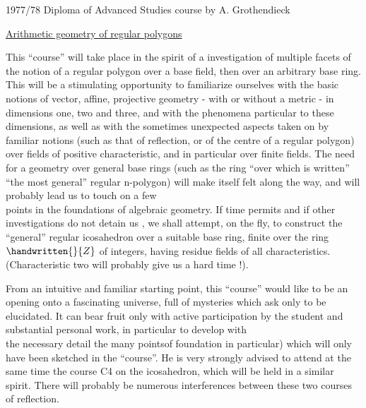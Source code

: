 \begin{center}
1977/78 Diploma of Advanced Studies course by A. Grothendieck

\uline{Arithmetic geometry of regular polygons}
\end{center}

{\reversemarginpar\margin{\handwritten{!}}\normalmarginpar}%
This ``course'' will take place in the spirit of a  investigation of multiple facets of the notion of a regular polygon over a base field, then over an arbitrary base ring. This will be a stimulating opportunity to familiarize ourselves with the basic notions of vector, affine, projective geometry - with or without a metric - in dimensions one, two and three, and with the phenomena particular to these dimensions, as well as with the sometimes unexpected aspects taken on by familiar notions (such as that of reflection, or of the centre of a regular polygon) over fields of positive characteristic, and in particular over finite fields. The need for a geometry over general base rings (such as the ring ``over which is written'' ``the most general'' regular $\mathrm{n}$-polygon) will make itself felt along the way, and will probably lead us to touch on a few\\
points in the foundations of algebraic geometry. If time permits and if other investigations do not detain us , we shall attempt, on the fly, to construct the ``general'' regular icosahedron over a suitable base ring, finite over the ring \hspace{.5em}${\handwritten{\mathbb}{Z}}$\hspace{.5em} of integers, having residue fields of all characteristics. (Characteristic two \hspace{.5em}will probably give us a hard time !).

From an intuitive and familiar starting point, this ``course'' would like to be an opening onto a fascinating universe, full of mysteries which ask only to be elucidated. It can bear fruit only with active participation by the student and substantial personal work, in particular to develop with\\
the necessary detail the many points\handwritten{(}of foundation in particular) which will only have been sketched in the ``course''. He is very strongly advised to attend at the same time the course \hspace{.5em}C4\hspace{.5em} on the icosahedron, which will be held in a similar spirit. There will probably be numerous interferences between these two courses of reflection.

